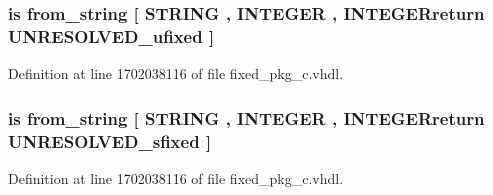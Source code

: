 \subsubsection[{from\+\_\+binary\+\_\+string}]{ {\bfseries \textcolor{keywordflow}{is}\textcolor{vhdlchar}{ }\textcolor{vhdlchar}{from\+\_\+string}\textcolor{vhdlchar}{ }\textcolor{vhdlchar}{\mbox{[}}\textcolor{vhdlchar}{ }\textcolor{comment}{S\+T\+R\+I\+N\+G}\textcolor{vhdlchar}{ }\textcolor{vhdlchar}{,}\textcolor{vhdlchar}{ }\textcolor{comment}{I\+N\+T\+E\+G\+E\+R}\textcolor{vhdlchar}{ }\textcolor{vhdlchar}{,}\textcolor{vhdlchar}{ }\textcolor{vhdlchar}{I\+N\+T\+E\+G\+E\+Rreturn}\textcolor{vhdlchar}{ }{\bfseries {\bf U\+N\+R\+E\+S\+O\+L\+V\+E\+D\+\_\+ufixed}} \textcolor{vhdlchar}{ }\textcolor{vhdlchar}{\mbox{]}}\textcolor{vhdlchar}{ }} \hspace{0.3cm}{\ttfamily [Alias]}}\label{classfixed__pkg_a7eb54bde4b5dd58cbf3cdff96c651c5a}


Definition at line 1702038116 of file fixed\+\_\+pkg\+\_\+c.\+vhdl.

\hypertarget{classfixed__pkg_ae4aecc377c66b9a720d8f2f1387aedfc}{}
\subsubsection[{from\+\_\+binary\+\_\+string}]{ {\bfseries \textcolor{keywordflow}{is}\textcolor{vhdlchar}{ }\textcolor{vhdlchar}{from\+\_\+string}\textcolor{vhdlchar}{ }\textcolor{vhdlchar}{\mbox{[}}\textcolor{vhdlchar}{ }\textcolor{comment}{S\+T\+R\+I\+N\+G}\textcolor{vhdlchar}{ }\textcolor{vhdlchar}{,}\textcolor{vhdlchar}{ }\textcolor{comment}{I\+N\+T\+E\+G\+E\+R}\textcolor{vhdlchar}{ }\textcolor{vhdlchar}{,}\textcolor{vhdlchar}{ }\textcolor{vhdlchar}{I\+N\+T\+E\+G\+E\+Rreturn}\textcolor{vhdlchar}{ }{\bfseries {\bf U\+N\+R\+E\+S\+O\+L\+V\+E\+D\+\_\+sfixed}} \textcolor{vhdlchar}{ }\textcolor{vhdlchar}{\mbox{]}}\textcolor{vhdlchar}{ }} \hspace{0.3cm}{\ttfamily [Alias]}}\label{classfixed__pkg_ae4aecc377c66b9a720d8f2f1387aedfc}


Definition at line 1702038116 of file fixed\+\_\+pkg\+\_\+c.\+vhdl.

\hypertarget{classfixed__pkg_a75662d795197c31b5987068ea5454087}{}
